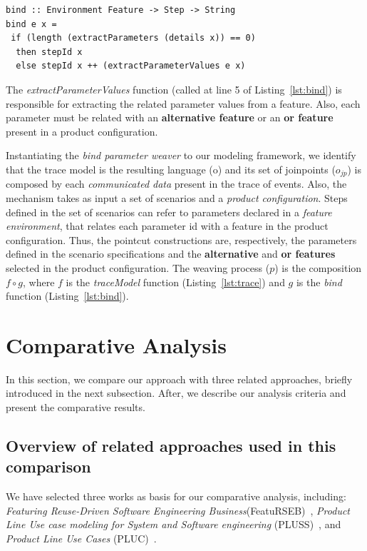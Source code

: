 \begin{lstlisting}[belowskip=10pt,frame=tb,caption={The \emph{bind waver} function},label=lst:bind]
bind :: Environment Feature -> Step -> String
bind e x =
 if (length (extractParameters (details x)) == 0)
  then stepId x
  else stepId x ++ (extractParameterValues e x)
\end{lstlisting}

The \emph{extractParameterValues} function (called at line 5 of
Listing~\ref{lst:bind}) is responsible for extracting the related
parameter values from a feature. Also, each parameter must be
related with an {\bf alternative feature} or an {\bf or feature}
present in a product configuration.

Instantiating the \emph{bind parameter weaver} to our
modeling framework, we identify that the trace model is the
resulting language (o) and its set of joinpoints ($o_{jp}$) is
composed by each \emph{communicated data} present in the trace of
events. Also, the mechanism takes as input a set of scenarios and a
\emph{product configuration}.
Steps defined in the set of scenarios can refer to parameters
declared in a \emph{feature environment}, that relates each
parameter id with a feature in the product configuration. Thus, the
pointcut constructions are, respectively, the
parameters defined in the scenario specifications and the {\bf
alternative} and {\bf or features} selected in the product
configuration. The weaving process ($p$) is the composition $f \circ
g$, where $f$ is the \emph{traceModel} function
(Listing~\ref{lst:trace}) and $g$ is the \emph{bind} function
(Listing~\ref{lst:bind}).

\section{Comparative Analysis}\label{sec:analysis}

In this section, we compare our approach with three related approaches,
briefly introduced in the next subsection. After, we describe our
analysis criteria and present the comparative results.

\subsection{Overview of related approaches used in this comparison}

We have selected three works as basis for our comparative analysis,
including: \emph{Featuring Reuse-Driven Software Engineering
Business}(FeatuRSEB)~\cite{griss-icsr-1998}, \emph{Product Line Use
case modeling for System and Software engineering}
(PLUSS)~\cite{eriksson-splc-2005}, and \emph{Product Line Use Cases}
(PLUC)~\cite{bertolino-esec-2003}. 

